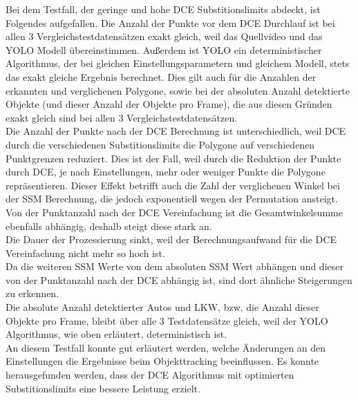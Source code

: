 {{		Bei dem Testfall, der geringe und hohe DCE Substitionslimits abdeckt, ist Folgendes aufgefallen. Die Anzahl der Punkte vor dem DCE Durchlauf ist bei allen 3 Vergleichstestdatensätzen exakt gleich, weil das Quellvideo und das YOLO Modell übereinstimmen. Außerdem ist YOLO ein deterministischer Algorithmus, der bei gleichen Einstellungsparametern und gleichem Modell, stets das exakt gleiche Ergebnis berechnet. Dies gilt auch für die Anzahlen der erkannten und verglichenen Polygone, sowie bei der absoluten Anzahl detektierte Objekte (und dieser Anzahl der Objekte pro Frame), die aus diesen Gründen exakt gleich sind bei allen 3 Vergleichstestdatensätzen. \\
		Die Anzahl der Punkte nach der DCE Berechnung ist unterschiedlich, weil DCE durch die verschiedenen Substitionslimits die Polygone auf verschiedenen Punktgrenzen reduziert. Dies ist der Fall, weil durch die Reduktion der Punkte durch DCE, je nach Einstellungen, mehr oder weniger Punkte die Polygone repräsentieren. Dieser Effekt betrifft auch die Zahl der verglichenen Winkel bei der SSM Berechnung, die jedoch exponentiell wegen der Permutation ansteigt. Von der Punktanzahl nach der DCE Vereinfachung ist die Gesamtwinkelsumme ebenfalls abhängig, deshalb steigt diese stark an. \\
		Die Dauer der Prozessierung sinkt, weil der Berechnungsaufwand für die DCE Vereinfachung nicht mehr so hoch ist. \\
		Da die weiteren SSM Werte von dem absoluten SSM Wert abhängen und dieser von der Punktanzahl nach der DCE abhängig ist, sind dort ähnliche Steigerungen zu erkennen. \\
		Die absolute Anzahl detektierter Autos und LKW, bzw. die Anzahl dieser Objekte pro Frame, bleibt über alle 3 Testdatensätze gleich, weil der YOLO Algorithmus, wie oben erläutert, deterministisch ist. \\
		An diesem Testfall konnte gut erläutert werden, welche Änderungen an den Einstellungen die Ergebnisse beim Objekttracking beeinflussen. Es konnte herausgefunden werden, dass der DCE Algorithmus mit optimierten Substitionslimits eine bessere Leistung erzielt. \\

}}
